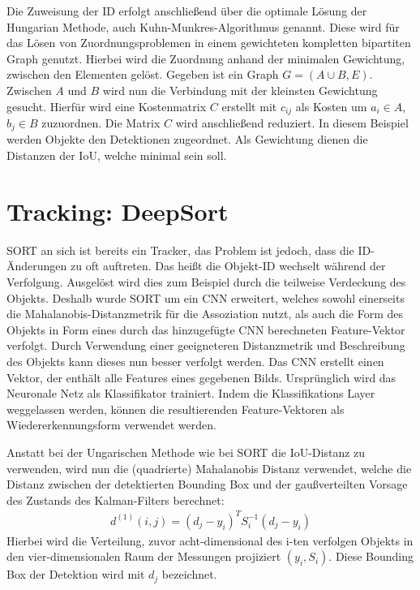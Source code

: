 \documentclass[conference]{IEEEtran}
\begin{document}
	
	
	Die Zuweisung der ID erfolgt anschließend über die optimale Lösung der Hungarian Methode, auch Kuhn-Munkres-Algorithmus genannt. Diese wird für das Lösen von Zuordnungsproblemen in einem gewichteten kompletten bipartiten Graph genutzt. Hierbei wird die Zuordnung anhand der minimalen Gewichtung, zwischen den Elementen gelöst. Gegeben ist ein Graph $G = (A \cup B, E) $. Zwischen $A$ und $B$ wird nun die Verbindung mit der kleinsten Gewichtung gesucht. Hierfür wird eine Kostenmatrix $C$ erstellt mit $c_{ij}$ als Kosten um $a_i \in A$, $b_j \in B$ zuzuordnen. Die Matrix $C$ wird anschließend reduziert. In diesem Beispiel werden Objekte den Detektionen zugeordnet. Als Gewichtung dienen die Distanzen der IoU, welche minimal sein soll.
	
	\section{Tracking: DeepSort}
	
	SORT an sich ist bereits ein Tracker, das Problem ist jedoch, dass die ID-Änderungen zu oft auftreten. Das heißt die Objekt-ID wechselt während der Verfolgung. Ausgelöst wird dies zum Beispiel durch die teilweise Verdeckung des Objekts. Deshalb wurde SORT um ein CNN erweitert, welches sowohl einerseits die Mahalanobis-Distanzmetrik für die Assoziation nutzt, als auch die Form des Objekts in Form eines durch das hinzugefügte CNN berechneten Feature-Vektor verfolgt. Durch Verwendung einer geeigneteren Distanzmetrik und Beschreibung des Objekts kann dieses nun besser verfolgt werden.
	Das CNN erstellt einen Vektor, der enthält alle Features eines gegebenen Bilds. Ursprünglich wird das Neuronale Netz als Klassifikator trainiert. Indem die Klassifikations Layer weggelassen werden, können die resultierenden Feature-Vektoren als Wiedererkennungsform verwendet werden.
	
	Anstatt bei der Ungarischen Methode wie bei SORT die IoU-Distanz zu verwenden, wird nun die (quadrierte) Mahalanobis Distanz verwendet, welche die Distanz zwischen der detektierten Bounding Box und der gaußverteilten Vorsage des Zustands des Kalman-Filters berechnet:
	\begin{align}
		d^{(1)}(i,j)= (d_j - y_i)^TS^{-1}_i(d_j - y_i)
	\end{align}
	Hierbei wird die Verteilung, zuvor acht-dimensional des i-ten verfolgen Objekts in den vier-dimensionalen Raum der Messungen projiziert $(y_i, S_i)$. Diese Bounding Box der Detektion wird mit $d_j$ bezeichnet. \\
	
\end{document}
